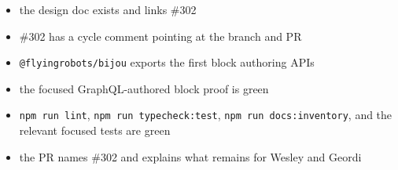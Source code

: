 \begin{itemize}
\tightlist
\item
  the design doc exists and links \#302
\item
  \#302 has a cycle comment pointing at the branch and PR
\item
  \texttt{@\allowbreak{}f\allowbreak{}l\allowbreak{}y\allowbreak{}i\allowbreak{}n\allowbreak{}g\allowbreak{}r\allowbreak{}o\allowbreak{}b\allowbreak{}o\allowbreak{}t\allowbreak{}s\allowbreak{}/\allowbreak{}b\allowbreak{}i\allowbreak{}j\allowbreak{}o\allowbreak{}u} exports the first block authoring APIs
\item
  the focused GraphQL-authored block proof is green
\item
  \texttt{n\allowbreak{}p\allowbreak{}m\allowbreak{} \allowbreak{}r\allowbreak{}u\allowbreak{}n\allowbreak{} \allowbreak{}l\allowbreak{}i\allowbreak{}n\allowbreak{}t}, \texttt{n\allowbreak{}p\allowbreak{}m\allowbreak{} \allowbreak{}r\allowbreak{}u\allowbreak{}n\allowbreak{} \allowbreak{}t\allowbreak{}y\allowbreak{}p\allowbreak{}e\allowbreak{}c\allowbreak{}h\allowbreak{}e\allowbreak{}c\allowbreak{}k\allowbreak{}:\allowbreak{}t\allowbreak{}e\allowbreak{}s\allowbreak{}t}, \texttt{n\allowbreak{}p\allowbreak{}m\allowbreak{} \allowbreak{}r\allowbreak{}u\allowbreak{}n\allowbreak{} \allowbreak{}d\allowbreak{}o\allowbreak{}c\allowbreak{}s\allowbreak{}:\allowbreak{}i\allowbreak{}n\allowbreak{}v\allowbreak{}e\allowbreak{}n\allowbreak{}t\allowbreak{}o\allowbreak{}r\allowbreak{}y}, and the relevant focused tests are green
\item
  the PR names \#302 and explains what remains for Wesley and Geordi
\end{itemize}

